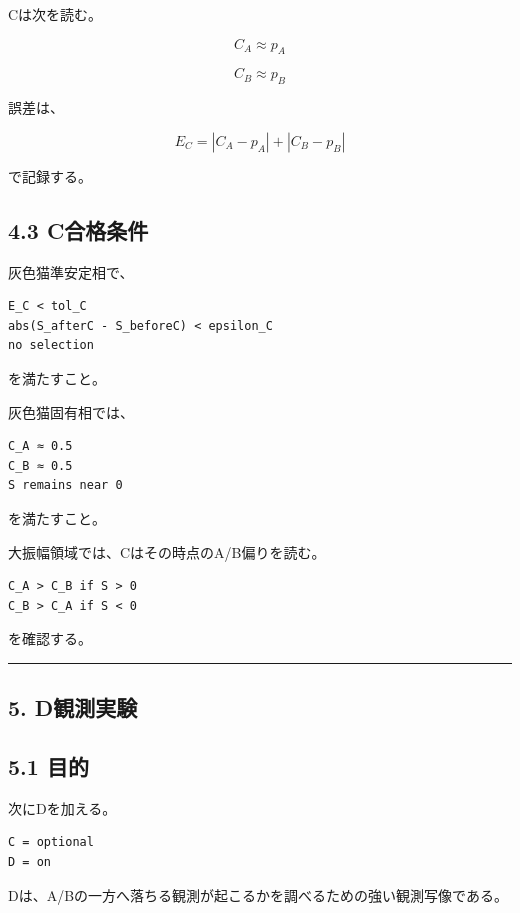 \documentclass{article}
\begin{document}
Cは次を読む。

\[
C_A \approx p_A
\]

\[
C_B \approx p_B
\]

誤差は、

\[
E_C = |C_A-p_A| + |C_B-p_B|
\]

で記録する。

\subsection{4.3 C合格条件}\label{cux5408ux683cux6761ux4ef6}

灰色猫準安定相で、

\begin{verbatim}
E_C < tol_C
abs(S_afterC - S_beforeC) < epsilon_C
no selection
\end{verbatim}

を満たすこと。

灰色猫固有相では、

\begin{verbatim}
C_A ≈ 0.5
C_B ≈ 0.5
S remains near 0
\end{verbatim}

を満たすこと。

大振幅領域では、Cはその時点のA/B偏りを読む。

\begin{verbatim}
C_A > C_B if S > 0
C_B > C_A if S < 0
\end{verbatim}

を確認する。

\begin{center}\rule{0.5\linewidth}{0.5pt}\end{center}

\subsection{5. D観測実験}\label{dux89b3ux6e2cux5b9fux9a13}

\subsection{5.1 目的}\label{ux76eeux7684-3}

次にDを加える。

\begin{verbatim}
C = optional
D = on
\end{verbatim}

Dは、A/Bの一方へ落ちる観測が起こるかを調べるための強い観測写像である。
\end{document}

